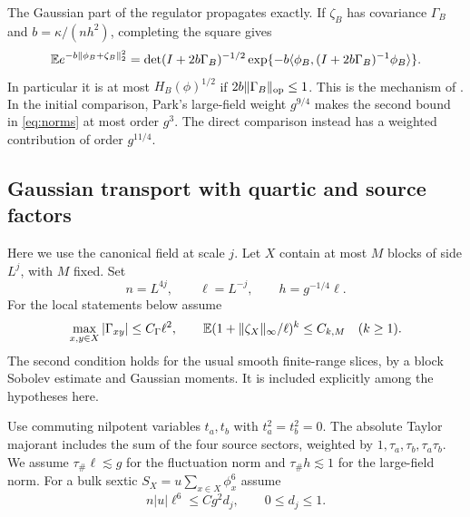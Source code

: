 \documentclass[11pt]{article}
\newcommand{\E}{\mathbb E}
\DeclarePairedDelimiter{\norm}{\lVert}{\rVert}
\begin{document}
The Gaussian part of the regulator propagates exactly. If \(\zeta_B\) has covariance \(\Gamma_B\) and \(b=\kappa/(nh^2)\), completing the square gives
\begin{equation}\label{eq:gaussH}
 \E e^{-b\norm{\phi_B+\zeta_B}_2^2}
 =
 \det(I+2b\Gamma_B)^{-1/2}
 \exp\{-b\langle\phi_B,(I+2b\Gamma_B)^{-1}\phi_B\rangle\}.
\end{equation}
In particular it is at most \(H_B(\phi)^{1/2}\) if \(2b\norm{\Gamma_B}_{\mathrm{op}}\le1\). This is the mechanism of \cite[Appendix C]{ParkMap}. In the initial comparison, Park's large-field weight \(g^{9/4}\) makes the second bound in \eqref{eq:norms} at most order \(g^3\). The direct comparison instead has a weighted contribution of order \(g^{11/4}\).

\subsection{Gaussian transport with quartic and source factors}

Here we use the canonical field at scale \(j\). Let \(X\) contain at most \(M\) blocks of side \(L^j\), with \(M\) fixed. Set
\[
 n=L^{4j},\qquad \ell=L^{-j},\qquad h=g^{-1/4}\ell.
\]
For the local statements below assume
\begin{equation}\label{eq:covass}
 \max_{x,y\in X}|\Gamma_{xy}|\le C_\Gamma\ell^2,\qquad
 \E(1+\norm{\zeta_X}_\infty/\ell)^k\le C_{k,M}
 \quad(k\ge1).
\end{equation}
The second condition holds for the usual smooth finite-range slices, by a block Sobolev estimate and Gaussian moments. It is included explicitly among the hypotheses here.

Use commuting nilpotent variables \(t_a,t_b\) with \(t_a^2=t_b^2=0\). The absolute Taylor majorant includes the sum of the four source sectors, weighted by \(1,\tau_a,\tau_b,\tau_a\tau_b\). We assume \(\tau_\#\ell\lesssim g\) for the fluctuation norm and \(\tau_\# h\lesssim1\) for the large-field norm. For a bulk sextic \(S_X=u\sum_{x\in X}\phi_x^6\) assume
\begin{equation}\label{eq:sizesix}
 n|u|\ell^6\le Cg^2 d_j,\qquad 0\le d_j\le1.
\end{equation}
\end{document}
